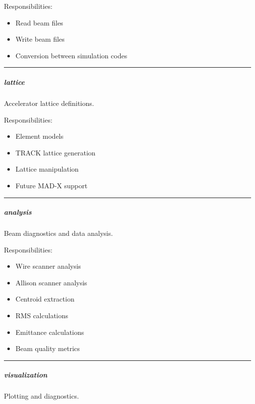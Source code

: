 \documentclass[
]{article}
\providecommand{\tightlist}{%
  \setlength{\itemsep}{0pt}\setlength{\parskip}{0pt}}
\begin{document}
Responsibilities:

\begin{itemize}
\tightlist
\item
  Read beam files
\item
  Write beam files
\item
  Conversion between simulation codes
\end{itemize}

\begin{center}\rule{0.5\linewidth}{0.5pt}\end{center}

\hypertarget{lattice}{%
\subparagraph{lattice}\label{lattice}}

Accelerator lattice definitions.

Responsibilities:

\begin{itemize}
\tightlist
\item
  Element models
\item
  TRACK lattice generation
\item
  Lattice manipulation
\item
  Future MAD-X support
\end{itemize}

\begin{center}\rule{0.5\linewidth}{0.5pt}\end{center}

\hypertarget{analysis}{%
\subparagraph{analysis}\label{analysis}}

Beam diagnostics and data analysis.

Responsibilities:

\begin{itemize}
\tightlist
\item
  Wire scanner analysis
\item
  Allison scanner analysis
\item
  Centroid extraction
\item
  RMS calculations
\item
  Emittance calculations
\item
  Beam quality metrics
\end{itemize}

\begin{center}\rule{0.5\linewidth}{0.5pt}\end{center}

\hypertarget{visualization}{%
\subparagraph{visualization}\label{visualization}}

Plotting and diagnostics.
\end{document}
